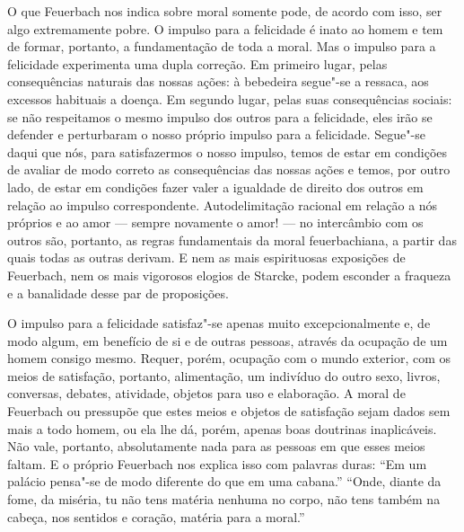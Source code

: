 O
que Feuerbach nos
indica sobre moral somente pode, de acordo com isso, ser algo
extremamente pobre. O impulso para a felicidade é inato ao homem e tem
de formar, portanto, a fundamentação de toda a moral. Mas o impulso para
a felicidade experimenta uma dupla correção.
Em primeiro lugar, pelas consequências naturais das nossas ações: à
bebedeira segue"-se a ressaca, aos excessos habituais a doença. Em
segundo lugar, pelas suas consequências sociais: se não respeitamos o
mesmo impulso dos outros para a felicidade, eles irão se defender e
perturbaram o nosso próprio impulso para a felicidade. Segue"-se daqui
que nós, para satisfazermos o nosso impulso, temos de estar em condições
de avaliar de modo correto as consequências das nossas ações e temos,
por outro lado, de estar em condições fazer valer a igualdade de direito
dos outros em relação ao impulso correspondente. Autodelimitação
racional em relação a nós próprios e ao amor --- sempre novamente o amor!
--- no intercâmbio com os outros são, portanto, as regras fundamentais da
moral feuerbachiana, a partir das quais todas as outras derivam. E nem
as mais espirituosas exposições
de Feuerbach,
nem os mais vigorosos elogios de Starcke, podem esconder a fraqueza e a
banalidade desse par de proposições.

O impulso para a felicidade satisfaz"-se apenas muito excepcionalmente e,
de modo algum, em benefício de si e de outras pessoas, através da
ocupação de um homem consigo mesmo. Requer, porém, ocupação com o mundo
exterior, com os meios de satisfação, portanto, alimentação, um
indivíduo do outro sexo, livros, conversas, debates, atividade, objetos
para uso e elaboração. A moral
de Feuerbach ou
pressupõe que estes meios e objetos de satisfação sejam dados sem mais a
todo homem, ou ela lhe dá, porém, apenas boas doutrinas inaplicáveis.
Não vale, portanto, absolutamente nada para as pessoas em que esses
meios faltam. E o
próprio Feuerbach nos
explica isso com palavras duras: ``Em um palácio pensa"-se de modo
diferente do que em uma cabana.'' ``Onde, diante da fome, da miséria, tu
não tens matéria nenhuma no corpo, não tens também na cabeça, nos
sentidos e coração, matéria para a moral.''


